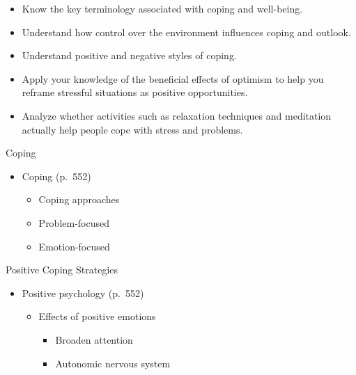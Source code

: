 \documentclass[
]{book}
\providecommand{\tightlist}{%
  \setlength{\itemsep}{0pt}\setlength{\parskip}{0pt}}
\begin{document}
\begin{reflect}
\begin{itemize}
\tightlist
\item
  Know the key terminology associated with coping and well-being.\\
\item
  Understand how control over the environment influences coping and outlook.\\
\item
  Understand positive and negative styles of coping.\\
\item
  Apply your knowledge of the beneficial effects of optimism to help you reframe stressful situations as positive opportunities.\\
\item
  Analyze whether activities such as relaxation techniques and meditation actually help people cope with stress and problems.
\end{itemize}

Coping

\begin{itemize}
\tightlist
\item
  Coping (p.~552)

  \begin{itemize}
  \tightlist
  \item
    Coping approaches\\
  \item
    Problem-focused\\
  \item
    Emotion-focused
  \end{itemize}
\end{itemize}

Positive Coping Strategies

\begin{itemize}
\tightlist
\item
  Positive psychology (p.~552)

  \begin{itemize}
  \tightlist
  \item
    Effects of positive emotions

    \begin{itemize}
    \tightlist
    \item
      Broaden attention\\
    \item
      Autonomic nervous system
    \end{itemize}
  \end{itemize}
\end{itemize}


\end{reflect}
\end{document}
